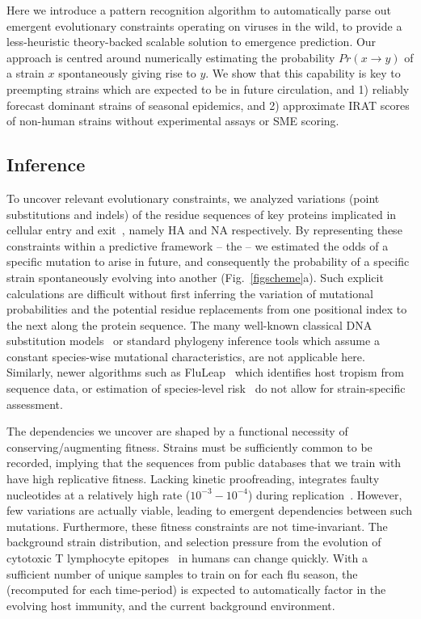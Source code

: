 \documentclass[onecolumn, compsoc,10pt]{IEEEtran}
\begin{document}
Here we introduce a pattern recognition algorithm to automatically parse out emergent evolutionary constraints operating on \infl viruses in the wild, to provide a less-heuristic theory-backed scalable solution to emergence prediction. Our approach is centred around numerically estimating the probability $Pr(x \rightarrow y)$ of a strain $x$ spontaneously giving rise to  $y$. We show that this capability is key to preempting  strains which are expected to be in future circulation, and  1) reliably forecast dominant strains of seasonal epidemics, and 2) approximate IRAT scores of non-human strains without  experimental assays or SME scoring.

\subsection*{\enet Inference}

To uncover relevant evolutionary constraints, we analyzed  variations (point substitutions and indels) of the  residue  sequences  of key proteins implicated  in cellular entry and exit~\cite{gamblin2010influenza,shao2017evolution}, namely HA and NA respectively. By representing these constraints within a predictive framework -- the \enet -- we estimated the  odds of a specific mutation to arise in future, and consequently the probability of a specific strain spontaneously  evolving into another (Fig.~\ref{figscheme}a).  Such explicit calculations are difficult  without first inferring the variation of mutational probabilities and the potential residue replacements from one positional index to the next along the protein sequence. The many well-known classical  DNA  substitution models~\cite{posada1998modeltest} or standard phylogeny inference tools which assume a constant species-wise mutational characteristics,  are not applicable here. Similarly, newer algorithms such  as FluLeap~\cite{eng2014predicting}  which identifies host tropism from sequence data, or estimation of species-level risk~\cite{grange2021ranking} do not allow for strain-specific assessment.

The dependencies we uncover are shaped by  a  functional necessity of conserving/augmenting  fitness. Strains must be sufficiently common  to be recorded, implying that the sequences from public databases that we train  with have  high replicative fitness. Lacking kinetic proofreading, \infl integrates  faulty nucleotides   at a relatively high rate ($10^{-3}-10^{-4}$) during  replication~\cite{ahlquist2002rna,chen2006avian}. However, few variations are actually viable, leading to emergent dependencies between such mutations. Furthermore, these fitness constraints are not time-invariant. The background strain distribution, and selection pressure from the evolution of cytotoxic T lymphocyte  epitopes~\cite{woolthuis2016long,fan2012role,van2016differential,berkhoff2007assessment,van2012evasion} in humans can change quickly. With a sufficient number of unique samples to train on for each flu season, the \enet (recomputed for each time-period) is expected to automatically factor in the evolving host immunity, and the current background environment.  
\end{document}
